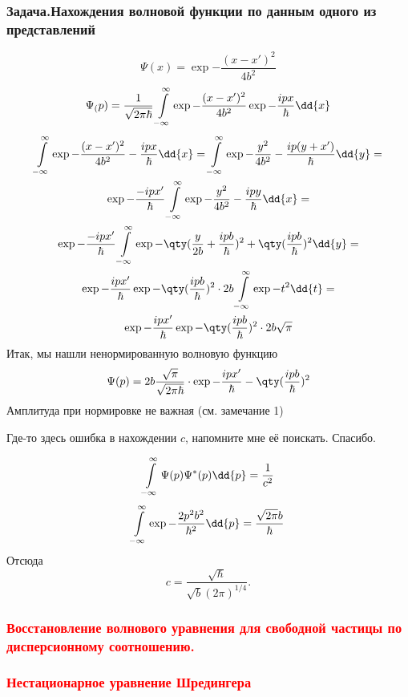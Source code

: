 \subsubsection{Задача.Нахождения волновой функции по данным одного из представлений}

$$\Psi(x)= \exp{-\frac{(x-x')^2}{4b^2}} $$
$$\Psi_(p)= \frac{1}{\sqrt{2\pi\hbar}}\infint \exp{-\frac{(x-x')^2}{4b^2}}\exp{-\frac{ipx}{\hbar}} \dd{x} $$
\begin{gather*}
\infint \exp{-\frac{(x-x')^2}{4b^2}-\frac{ipx}{\hbar} }\dd{x} = 
\infint \exp{-\frac{y^2}{4b^2}-\frac{ip(y+x')}{\hbar}} \dd{y} = \\
\exp{-\frac{-ipx'}{\hbar}}\infint \exp{-\frac{y^2}{4b^2}-\frac{ipy}{\hbar}}  \dd{x}=\\
\exp{-\frac{-ipx'}{\hbar}}\infint \exp{-\qty( \frac{y}{2b}+ \frac{ipb}{\hbar})^2
+\qty( \frac{ipb}{\hbar}  )^2} \dd{y}=\\
\exp{-\frac{ipx'}{\hbar}}\exp{-\qty(\frac{ipb}{\hbar})^2}\cdot 2b \infint \exp{-t^2} \dd{t}=\\
\exp{-\frac{ipx'}{\hbar}}\exp{-\qty(\frac{ipb}{\hbar})^2}\cdot 2b\sqrt\pi
\end{gather*}
Итак, мы нашли ненормированную волновую функцию 
$$\Psi(p)= 2b\frac{\sqrt\pi}{\sqrt{2\pi\hbar}} \cdot \exp{-\frac{ipx'}{\hbar}-\qty(\frac{ipb}{\hbar})^2}$$
Амплитуда при нормировке не важная (см. замечание 1)

Где-то здесь ошибка в нахождении $c$, напомните мне её поискать. Спасибо.

$$\infint \Psi(p)\Psi^*(p)\dd{p}=\frac{1}{c^2}$$
$$\infint\exp{-\frac{2p^2b^2}{\hbar^2}}\dd{p}=\frac{\sqrt{2\pi} b}{\hbar}$$
Отсюда 
$$c=\frac{\sqrt{\hbar}}{\sqrt b (2\pi)^{1/4}}.$$
\subsubsection{\textcolor{red} {Восстановление волнового уравнения для свободной частицы по дисперсионному
соотношению.} }

\subsubsection{\textcolor{red} {Нестационарное уравнение Шредингера} }